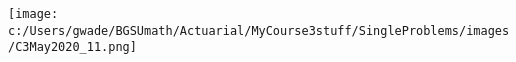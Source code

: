 
\texttt{[image: c:/Users/gwade/BGSUmath/Actuarial/MyCourse3stuff/SingleProblems/images/C3May2020\_11.png]}


\showsol{\bsoln

\esoln}
